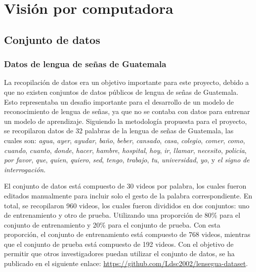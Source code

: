 

\section{Visión por computadora} 

\subsection{Conjunto de datos}

\subsubsection{Datos de lengua de señas de Guatemala}

La recopilación de datos era un objetivo importante para este proyecto, debido a que no existen conjuntos de datos públicos de lengua de señas de Guatemala. 
Esto representaba un desafio importante para el desarrollo de un modelo de reconocimiento de lengua de señas, ya que no se contaba con datos para entrenar un modelo de aprendizaje.
Siguiendo la metodología propuesta para el proyecto, se recopilaron datos de 32 palabras de la lengua de señas de Guatemala, las cuales son: 
\textit{agua}, \textit{ayer}, \textit{ayudar}, \textit{baño}, \textit{beber}, 
\textit{cansado}, \textit{casa}, \textit{colegio}, \textit{comer}, \textit{como}, 
\textit{cuando}, \textit{cuanto}, \textit{donde}, \textit{hacer}, \textit{hambre}, 
\textit{hospital}, \textit{hoy}, \textit{ir}, \textit{llamar}, \textit{necesito}, 
\textit{policia}, \textit{por favor}, \textit{que}, \textit{quien}, \textit{quiero}, 
\textit{sed}, \textit{tengo}, \textit{trabajo}, \textit{tu}, \textit{universidad}, 
\textit{yo}, y \textit{el signo de interrogación}.

El conjunto de datos está compuesto de 30 videos por palabra, los cuales fueron editados manualmente para incluir solo el gesto de la palabra correspondiente.
En total, se recopilaron 960 videos, los cuales fueron divididos en dos conjuntos: uno de entrenamiento y otro de prueba.
Utilizando una proporción de 80\% para el conjunto de entrenamiento y 20\% para el conjunto de prueba.
Con esta proporción, el conjunto de entrenamiento está compuesto de 768 videos, mientras que el conjunto de prueba está compuesto de 192 videos.
Con el objetivo de permitir que otros investigadores puedan utilizar el conjunto de datos, se ha publicado en el siguiente enlace: \url{https://github.com/Ldsc2002/lensegua-dataset}.

